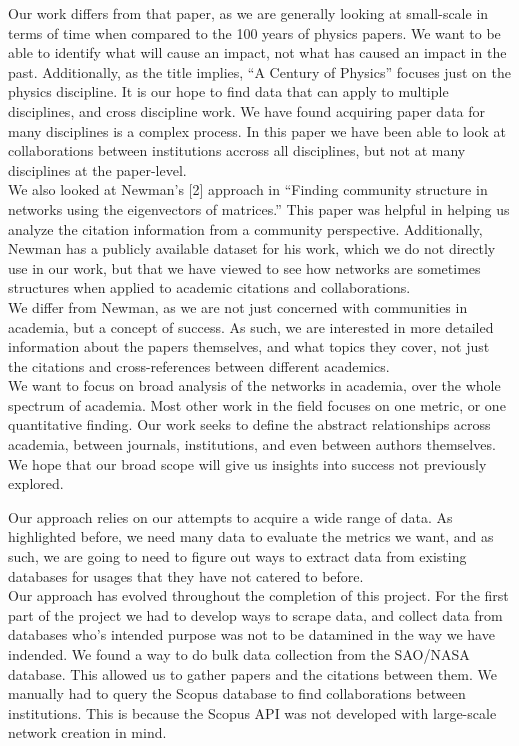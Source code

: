 \documentclass[times, 10pt,twocolumn]{article}
\begin{document}
Our work differs from that paper, as we are generally looking at small-scale in terms of time when compared to the 100 years of physics papers. We want to be able to identify what will cause an impact, not what has caused an impact in the past. Additionally, as the title implies, “A Century of Physics” focuses just on the physics discipline. It is our hope to find data that can apply to multiple disciplines, and cross discipline work. We have found  acquiring paper data for many disciplines is a complex process. In this paper we have been able to look at collaborations between institutions accross all disciplines, but not at many disciplines at the paper-level. \\

We also looked at Newman’s [2] approach in “Finding community structure in networks using the eigenvectors of matrices.” This paper was helpful in helping us analyze the citation information from a community perspective. Additionally, Newman has a publicly available dataset for his work, which we do not directly use in our work, but that we have viewed to see how networks are sometimes structures when applied to academic citations and collaborations.\\

We differ from Newman, as we are not just concerned with communities in academia, but a concept of success. As such, we are interested in more detailed information about the papers themselves, and what topics they cover, not just the citations and cross-references between different academics. \\

We want to focus on broad analysis of the networks in academia, over the whole spectrum of academia. Most other work in the field focuses on one metric, or one quantitative finding. Our work seeks to define the abstract relationships across academia, between journals, institutions, and even between authors themselves. We hope that our broad scope will give us insights into success not previously explored.

Our approach relies on our attempts to acquire a wide range of data. As highlighted before, we need many data to evaluate the metrics we want, and as such, we are going to need to figure out ways to extract data from existing databases for usages that they have not catered to before.\\

Our approach has evolved throughout the completion of this project. For the first part of the project we had to develop ways to scrape data, and collect data from databases who's intended purpose was not to be datamined in the way we have indended. We found a way to do bulk data collection from the SAO/NASA database. This allowed us to gather papers and the citations between them. We manually had to query the Scopus database to find collaborations between institutions. This is because the Scopus API was not developed with large-scale network creation in mind. \\
\end{document}

